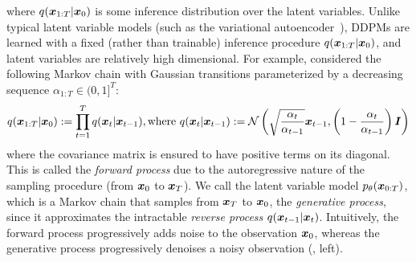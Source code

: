 where $q({\bm{x}}_{1:T} | {\bm{x}}_0)$ is some inference distribution over the latent variables.
Unlike typical latent variable models (such as the variational autoencoder~\citep{rezende2014stochastic}), DDPMs are learned with a fixed (rather than trainable) inference procedure $q({\bm{x}}_{1:T} | {\bm{x}}_0)$, 
and latent variables are relatively high dimensional. 
For example, \citet{ho2020denoising} considered the following Markov chain with Gaussian transitions 
parameterized by a decreasing sequence
$\alpha_{1:T} \in (0, 1]^T$:
\begin{align}
    q({\bm{x}}_{1:T} | {\bm{x}}_0) := \prod_{t=1}^{T} q({\bm{x}}_t | {\bm{x}}_{t-1}), \text{where} \ q({\bm{x}}_t | {\bm{x}}_{t-1}) := {\mathcal{N}}\left(\sqrt{\frac{\alpha_t}{\alpha_{t-1}}} {\bm{x}}_{t-1}, \left(1 - \frac{\alpha_t}{\alpha_{t-1}}\right) {\bm{I}}\right) \label{eq:diff-ho}
\end{align}
where the covariance matrix is ensured to have positive terms on its diagonal.
This is called the \textit{forward process} due to the autoregressive nature of the sampling procedure (from ${\bm{x}}_0$ to ${\bm{x}}_T$). We call the latent variable model $p_\theta({\bm{x}}_{0:T})$, which is a Markov chain that samples from ${\bm{x}}_T$ to ${\bm{x}}_0$, the \textit{generative process}, since it approximates the intractable \textit{reverse process} $q({\bm{x}}_{t-1} | {\bm{x}}_t)$. Intuitively, the forward process progressively adds noise to the observation ${\bm{x}}_0$, whereas the generative process progressively denoises a noisy observation (, left).

